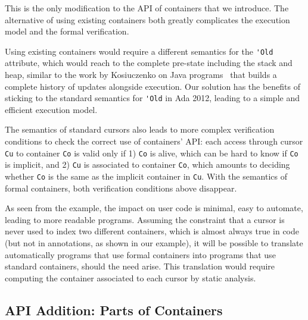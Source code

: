 \documentclass[runningheads,a4paper]{llncs}
\newcommand{\beforesub}{\vspace{-0.2cm}}
\newcommand{\aftersub}{\vspace{-0.1cm}}
\begin{document}

This is the only modification to the API of containers that we introduce. The
alternative of using existing containers both greatly complicates the execution
model and the formal verification.

Using existing containers would require a different semantics for the \verb|'Old|
attribute, which would reach to the complete pre-state including the stack and
heap, similar to the work by Kosiuczenko on Java
programs~\cite{kosiuczenko:2010:mpc} that builds a complete history of updates
alongside execution. Our solution has the benefits of sticking to the standard
semantics for \verb|'Old| in Ada 2012, leading to a simple and efficient execution model.

The semantics of standard cursors also leads to more complex verification
conditions to check the correct use of containers' API: each access through
cursor \verb|Cu| to container \verb|Co| is valid only if 1) \verb|Co| is alive,
which can be hard to know if \verb|Co| is implicit, and 2) \verb|Cu| is
associated to container \verb|Co|, which amounts to deciding whether \verb|Co|
is the same as the implicit container in \verb|Cu|. With the semantics of
formal containers, both verification conditions above disappear.

\ifdefined\longversion
As seen from the example, the impact on user code is minimal, easy to automate,
leading to more readable programs. Assuming the constraint that a cursor is
never used to index two different containers, which is almost always true in
code (but not in annotations, as shown in our example), it will be possible to
translate automatically programs that use formal containers into programs that
use standard containers, should the need arise. This translation would require
computing the container associated to each cursor by static analysis.
\fi

\beforesub
\subsection{API Addition: Parts of Containers}
\label{sec:container-parts}
\aftersub
\end{document}
